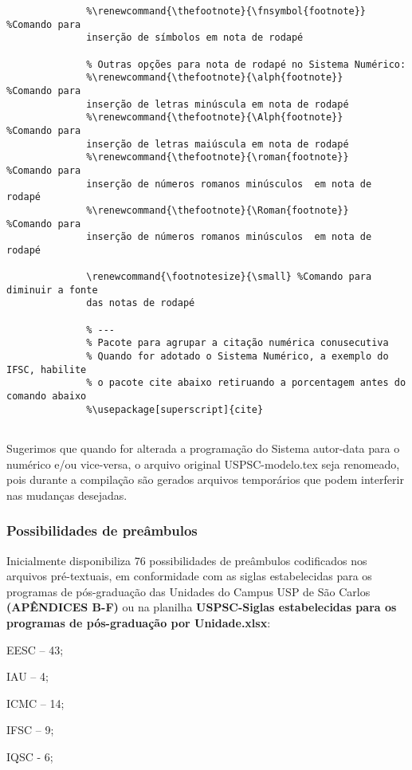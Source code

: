 \begin{verbatim}
			  %\renewcommand{\thefootnote}{\fnsymbol{footnote}} %Comando para 
			  inserção de símbolos em nota de rodapé
			  
			  % Outras opções para nota de rodapé no Sistema Numérico:
			  %\renewcommand{\thefootnote}{\alph{footnote}}     %Comando para 
			  inserção de letras minúscula em nota de rodapé
			  %\renewcommand{\thefootnote}{\Alph{footnote}}     %Comando para 
			  inserção de letras maiúscula em nota de rodapé
			  %\renewcommand{\thefootnote}{\roman{footnote}}    %Comando para 
			  inserção de números romanos minúsculos  em nota de rodapé
			  %\renewcommand{\thefootnote}{\Roman{footnote}}    %Comando para 
			  inserção de números romanos minúsculos  em nota de rodapé
			  
			  \renewcommand{\footnotesize}{\small} %Comando para diminuir a fonte 
			  das notas de rodapé	
			  
			  % ---
			  % Pacote para agrupar a citação numérica conusecutiva
			  % Quando for adotado o Sistema Numérico, a exemplo do IFSC, habilite 
			  % o pacote cite abaixo retiruando a porcentagem antes do comando abaixo
			  %\usepackage[superscript]{cite}
			  	
			 \end{verbatim}
			 
Sugerimos que quando for alterada a programação do Sistema autor-data para o numérico e/ou vice-versa, o arquivo original USPSC-modelo.tex seja renomeado, pois durante a compilação são gerados arquivos temporários que podem interferir nas mudanças desejadas.			 
\subsubsection{Possibilidades de preâmbulos}

Inicialmente disponibiliza 76 possibilidades de preâmbulos codificados nos arquivos pré-textuais, em conformidade com as siglas estabelecidas para os programas de pós-graduação das Unidades do Campus USP de São Carlos \textbf{(APÊNDICES B-F)} ou na planilha \textbf{USPSC-Siglas estabelecidas para os programas de pós-graduação por Unidade.xlsx}:
	
				  
			   \begin{alineas}
			   	\item EESC – 43;
				\item IAU – 4;
				\item  ICMC – 14;
				\item  IFSC – 9;
				\item  IQSC - 6;
			  \end{alineas}							
